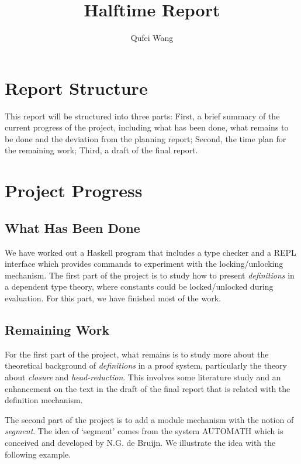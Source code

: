 \documentclass{article}
\theoremstyle{remark}
\begin{document}
\title{Halftime Report}
\author{Qufei Wang}
\maketitle

\tableofcontents

\clearpage

\section{Report Structure}
This report will be structured into three parts: First, a brief summary of the current progress of the project, including what has been done, what remains to be done and the deviation from the planning report; Second, the time plan for the remaining work; Third, a draft of the final report. 

\section{Project Progress}
\subsection{What Has Been Done}
We have worked out a Haskell program that includes a type checker and a REPL interface which provides commands to experiment with the locking/unlocking mechanism. The first part of the project is to study how to present \emph{definitions} in a dependent type theory, where constants could be locked/unlocked during evaluation. For this part, we have finished most of the work.

\subsection{Remaining Work}
For the first part of the project, what remains is to study more about the theoretical background of \emph{definitions} in a proof system, particularly the theory about \emph{closure} and \emph{head-reduction}. This involves some literature study and an enhancement on the text in the draft of the final report that is related with the definition mechanism.

The second part of the project is to add a module mechanism with the notion of \emph{segment}. The idea of `segment' comes from the system AUTOMATH \cite{de1994survey} which is conceived and developed by N.G. de Bruijn. We illustrate the idea with the following example. 
\end{document}
